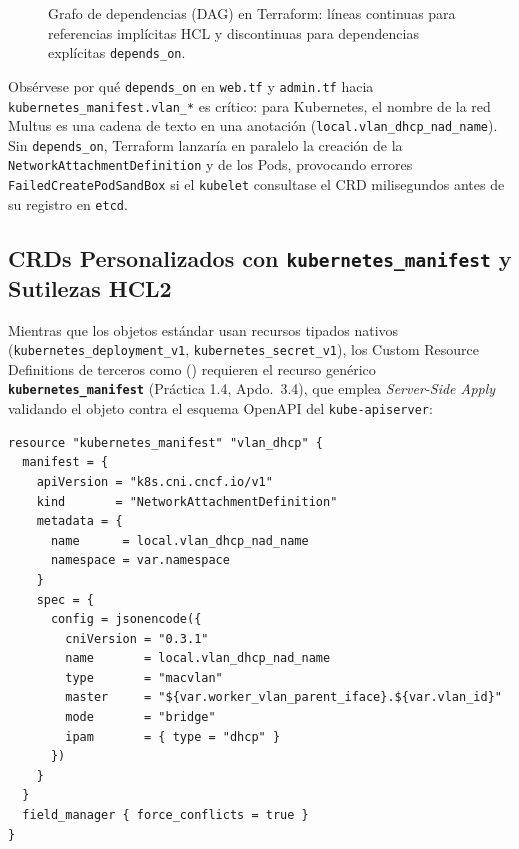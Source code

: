 \begin{figure}[H]
\caption{Grafo de dependencias (DAG) en Terraform: líneas continuas para referencias implícitas HCL y discontinuas para dependencias explícitas \texttt{depends\_on}.}
\label{fig:dag-terraform}
\end{figure}

Obsérvese por qué \texttt{depends\_on} en \texttt{web.tf} y \texttt{admin.tf} hacia \texttt{kubernetes\_manifest.vlan\_*} es crítico: para Kubernetes, el nombre de la red Multus es una cadena de texto en una anotación (\texttt{local.vlan\_dhcp\_nad\_name}). Sin \texttt{depends\_on}, Terraform lanzaría en paralelo la creación de la \texttt{NetworkAttachmentDefinition} y de los Pods, provocando errores \texttt{FailedCreatePodSandBox} si el \texttt{kubelet} consultase el CRD milisegundos antes de su registro en \texttt{etcd}.

\subsection{CRDs Personalizados con \texttt{kubernetes\_manifest} y Sutilezas HCL2}

Mientras que los objetos estándar usan recursos tipados nativos (\texttt{kubernetes\_deployment\_v1}, \texttt{kubernetes\_secret\_v1}), los Custom Resource Definitions de terceros como  () requieren el recurso genérico \textbf{\texttt{kubernetes\_manifest}} (Práctica 1.4, Apdo.~3.4), que emplea \textit{Server-Side Apply} validando el objeto contra el esquema OpenAPI del \texttt{kube-apiserver}:

\begin{lstlisting}[language=HCL,caption={Definición declarativa de las redes Multus en \texttt{terraform/multus.tf} usando \texttt{locals} y \texttt{jsonencode()}.}]
resource "kubernetes_manifest" "vlan_dhcp" {
  manifest = {
    apiVersion = "k8s.cni.cncf.io/v1"
    kind       = "NetworkAttachmentDefinition"
    metadata = {
      name      = local.vlan_dhcp_nad_name
      namespace = var.namespace
    }
    spec = {
      config = jsonencode({
        cniVersion = "0.3.1"
        name       = local.vlan_dhcp_nad_name
        type       = "macvlan"
        master     = "${var.worker_vlan_parent_iface}.${var.vlan_id}"
        mode       = "bridge"
        ipam       = { type = "dhcp" }
      })
    }
  }
  field_manager { force_conflicts = true }
}
\end{lstlisting}

